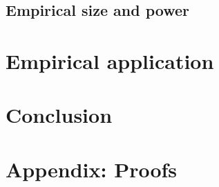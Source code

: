 \documentclass[harvard,11pt]{article}
\begin{document}
\subsection{Empirical size and power \label{Empirical size and power}}

\section{Empirical application\label{Empirical application}}


\section{Conclusion \label{Conclusion}}

\newpage

% 

\newpage

\section{Appendix: Proofs \label{Appendix: Proofs}}
\end{document}
